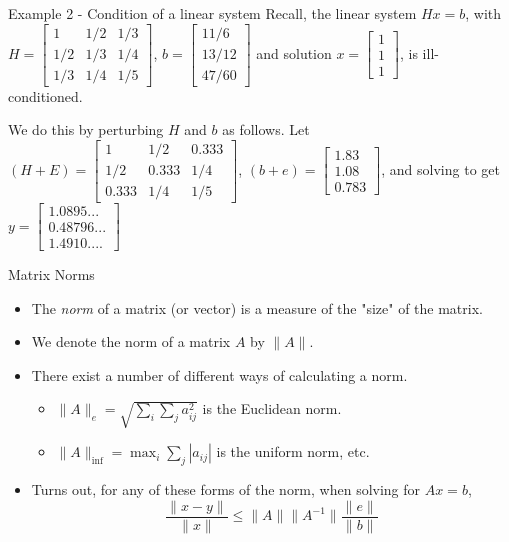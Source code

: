 \documentclass[12pt]{beamer}
\begin{document}
\begin{frame}{Example 2 - Condition of a linear system}
Recall, the linear system $Hx=b$, with $H=\begin{bmatrix} 1 &	1/2 & 1/3 \\ 1/2	 & 1/3 & 1/4 \\ 1/3 & 1/4 & 1/5 \end{bmatrix}$, $b=\begin{bmatrix} 11/6 \\ 13/12 \\ 47/60 \end{bmatrix}$ and solution $x=\begin{bmatrix} 1 \\ 1 \\ 1 \end{bmatrix}$, is ill-conditioned. 

We do this by perturbing $H$ and $b$ as follows. Let $(H+E)=\begin{bmatrix} 1 &	1/2 & 0.333 \\ 1/2	 & 0.333 & 1/4 \\ 0.333 & 1/4 & 1/5 \end{bmatrix}$, $(b+e)=\begin{bmatrix} 1.83 \\ 1.08 \\ 0.783 \end{bmatrix}$, and solving to get $y=\begin{bmatrix} 1.0895... \\ 0.48796... \\ 1.4910.... \end{bmatrix}$

\vspace{3 in}
\end{frame} 

\begin{frame}{Matrix Norms}

\begin{itemize}

\item{The {\it norm} of a matrix (or vector) is a measure of the "size" of the matrix.}
\item{We denote the norm of a matrix $A$ by $\|A\|$.}
\item{There exist a number of different ways of calculating a norm.}
\begin{itemize}
\item{$\|A\|_e=\sqrt{\sum_i{\sum_j{a_{ij}^2}}}$ is the Euclidean norm.}
\item{$\|A\|_{\inf}=\max_i{\sum_j{|a_{ij}|}}$ is the uniform norm, etc.}
\end{itemize}
\item{Turns out, for any of these forms of the norm, when solving for $Ax=b$,
\[
\frac{\|x-y\|}{\|x\|} \leq \|A\|\|A^{-1}\|\frac{\|e\|}{\|b\|}
\]}
\end{itemize}
\end{frame}
\end{document}
